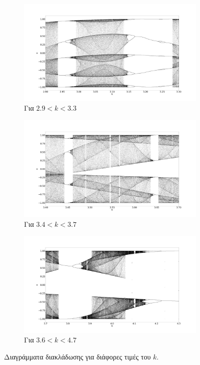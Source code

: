 \begin{figure}[ht]
	\centering
	
	\begin{subfigure}[b]{0.8\textwidth}
		\centering
		\includegraphics[width=\textwidth]{LateX images/cheb q=0.8/g3}
		\caption{Για $2.9<k<3.3$}
		\label{f:g61}
	\end{subfigure}
	\hfill
	\begin{subfigure}[b]{0.8\textwidth}
		\centering
		\includegraphics[width=\textwidth]{LateX images/cheb q=0.8/g4}
		\caption{Για $3.4<k<3.7$}
		\label{f:g62}
	\end{subfigure}
	\hfill
	\begin{subfigure}[b]{0.8\textwidth}
		\centering
		\includegraphics[width=\textwidth]{LateX images/cheb q=0.8/g5}
		\caption{Για $3.6<k<4.7$}
		\label{f:g63}
	\end{subfigure}
	
	\caption{Διαγράμματα διακλάδωσης για διάφορες τιμές του $k$. }
	\label{f:g64}
\end{figure}

